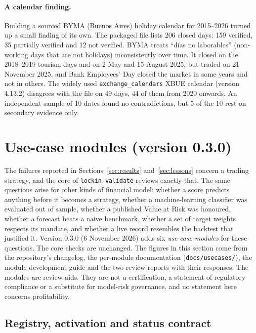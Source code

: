 \documentclass[11pt]{article}
\begin{document}
\paragraph{A calendar finding.} Building a sourced BYMA (Buenos Aires) holiday calendar for 2015--2026 turned up a small finding of its own. The packaged file lists 206 closed days: 159 verified, 35 partially verified and 12 not verified. BYMA treats ``d\'ias no laborables'' (non-working days that are not holidays) inconsistently over time. It closed on the 2018--2019 tourism days and on 2 May and 15 August 2025, but traded on 21 November 2025, and Bank Employees' Day closed the market in some years and not in others. The widely used \texttt{exchange\_calendars} XBUE calendar (version 4.13.2) disagrees with the file on 49 days, 44 of them from 2020 onwards. An independent sample of 10 dates found no contradictions, but 5 of the 10 rest on secondary evidence only.

\section{Use-case modules (version 0.3.0)}\label{sec:usecases}

The failures reported in Sections~\ref{sec:results} and~\ref{sec:lessons} concern a trading strategy, and the core of \texttt{lockin-validate} reviews exactly that. The same questions arise for other kinds of financial model: whether a score predicts anything before it becomes a strategy, whether a machine-learning classifier was evaluated out of sample, whether a published Value at Risk was honoured, whether a forecast beats a naive benchmark, whether a set of target weights respects its mandate, and whether a live record resembles the backtest that justified it. Version 0.3.0 (6 November 2026) adds six \emph{use-case modules} for these questions. The core checks are unchanged. The figures in this section come from the repository's changelog, the per-module documentation (\texttt{docs/usecases/}), the module development guide and the two review reports with their responses. The modules are review aids. They are not a certification, a statement of regulatory compliance or a substitute for model-risk governance, and no statement here concerns profitability.

\subsection{Registry, activation and status contract}
\end{document}
